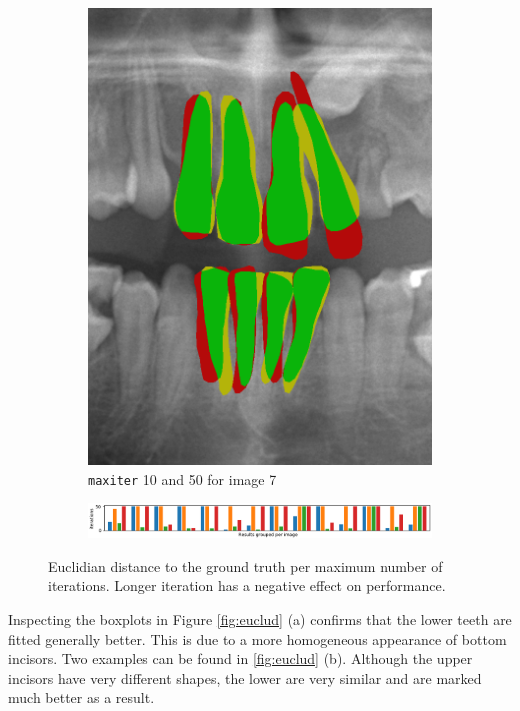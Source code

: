 \documentclass[a4paper,titlepage,12pt]{article}
\begin{document}
\begin{figure}
\begin{subfigure}{0.57\linewidth}
		\includegraphics[width=0.45\columnwidth]{results/7i50}
		\caption{\texttt{maxiter} 10 and 50 for image 7}
	\end{subfigure}

	\begin{subfigure}{\linewidth}
		\centering
		\includegraphics[width=0.98\columnwidth]{results/chart_numit}
		\caption{}
	\end{subfigure}
	\caption{Euclidian distance to the ground truth per maximum number of iterations. Longer iteration has a negative effect on performance. } %
	\label{fig:euclit}
\end{figure}

Inspecting the boxplots in Figure \ref{fig:euclud} (a) confirms that the lower teeth are fitted generally better. This is due to a more homogeneous appearance of bottom incisors. Two examples can be found in \ref{fig:euclud} (b). Although the upper incisors have very different shapes, the lower are very similar and are marked much better as a result. 
\end{document}
